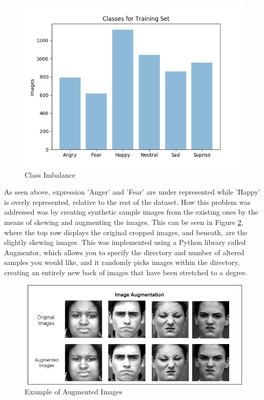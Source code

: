 \begin{figure}[ht]
	\begin{center}
		\advance\leftskip-3cm
		\advance\rightskip-3cm
		\includegraphics[keepaspectratio=true,scale=0.6]{__resources/implementation/imbalance.jpg}
		\caption{Class Imbalance}
		\label{imbal}
	\end{center}
\end{figure}\newpage
As seen above, expression 'Anger' and 'Fear' are under represented while 'Happy' is overly represented, relative to the rest of the dataset. How this problem was addressed was by creating synthetic sample images from the existing ones by the means of skewing and augmenting the images. This can be seen in Figure \ref{augm}, where the top row displays the original cropped images, and beneath, are the slightly skewing images. This was implemented using a Python library called Augmentor, which allows you to specify the directory and number of altered samples you would like, and it randomly picks images within the directory, creating an entirely new back of images that have been stretched to a degree.
\begin{figure}[ht]
	\begin{center}
		\advance\leftskip-3cm
		\advance\rightskip-3cm
		\includegraphics[keepaspectratio=true,scale=0.6]{__resources/implementation/augmented-images.png}
		\caption{Example of Augmented Images}
		\label{augm}
	\end{center}
\end{figure}
\newpage

